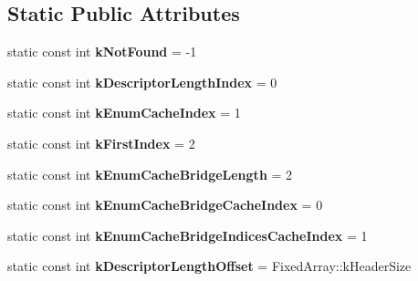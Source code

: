 \subsection*{Static Public Attributes}
\begin{DoxyCompactItemize}
\item 
\hypertarget{classv8_1_1internal_1_1_descriptor_array_a616314d46969c56bb8a8586f97173624}{}static const int {\bfseries k\+Not\+Found} = -\/1\label{classv8_1_1internal_1_1_descriptor_array_a616314d46969c56bb8a8586f97173624}

\item 
\hypertarget{classv8_1_1internal_1_1_descriptor_array_afd2a103ec4261706423457393dcce941}{}static const int {\bfseries k\+Descriptor\+Length\+Index} = 0\label{classv8_1_1internal_1_1_descriptor_array_afd2a103ec4261706423457393dcce941}

\item 
\hypertarget{classv8_1_1internal_1_1_descriptor_array_a5cf9108a849b7b726bfb37eed4db2f75}{}static const int {\bfseries k\+Enum\+Cache\+Index} = 1\label{classv8_1_1internal_1_1_descriptor_array_a5cf9108a849b7b726bfb37eed4db2f75}

\item 
\hypertarget{classv8_1_1internal_1_1_descriptor_array_ade15110ea3f85740688adf93973e6fe0}{}static const int {\bfseries k\+First\+Index} = 2\label{classv8_1_1internal_1_1_descriptor_array_ade15110ea3f85740688adf93973e6fe0}

\item 
\hypertarget{classv8_1_1internal_1_1_descriptor_array_ac6ec69727df78fd0383c2868996298eb}{}static const int {\bfseries k\+Enum\+Cache\+Bridge\+Length} = 2\label{classv8_1_1internal_1_1_descriptor_array_ac6ec69727df78fd0383c2868996298eb}

\item 
\hypertarget{classv8_1_1internal_1_1_descriptor_array_a2258b1456fdde910ff2dd05e0c49ac1d}{}static const int {\bfseries k\+Enum\+Cache\+Bridge\+Cache\+Index} = 0\label{classv8_1_1internal_1_1_descriptor_array_a2258b1456fdde910ff2dd05e0c49ac1d}

\item 
\hypertarget{classv8_1_1internal_1_1_descriptor_array_a1547950e97d668f894eadc6f4cdbe802}{}static const int {\bfseries k\+Enum\+Cache\+Bridge\+Indices\+Cache\+Index} = 1\label{classv8_1_1internal_1_1_descriptor_array_a1547950e97d668f894eadc6f4cdbe802}

\item 
\hypertarget{classv8_1_1internal_1_1_descriptor_array_a5e7e4ba18cc797ff4520421e76e38db8}{}static const int {\bfseries k\+Descriptor\+Length\+Offset} = Fixed\+Array\+::k\+Header\+Size\label{classv8_1_1internal_1_1_descriptor_array_a5e7e4ba18cc797ff4520421e76e38db8}


\end{DoxyCompactItemize}
